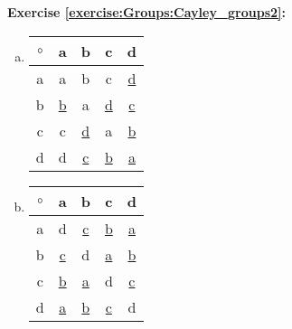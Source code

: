 \noindent\textbf{Exercise \ref{exercise:Groups:Cayley_groups2}:}
\begin{multicols}{2}
\begin{enumerate}[(a)]

\item
\begin{center}
		\begin{tabular}{c| c c c c }
			$\circ$ & a & b & c & d\\
			\hline
			a & a & b & c & \underline{d}\\
			b & \underline{b} & a & \underline{d} & \underline{c}\\
			c & c & \underline{d} & a & \underline{b}\\
			d & d & \underline{c} & \underline{b} & \underline{a}
		\end{tabular}
	\end{center}


\item
\begin{center}
		\begin{tabular}{c| c c c c }
			$\circ$ & a & b & c & d\\
			\hline
			a & d & \underline{c} & \underline{b} & \underline{a}\\
			b &\underline{c} & d & \underline{a} & \underline{b}\\
			c & \underline{b} & \underline{a} & d & \underline{c}\\
			d & \underline{a} & \underline{b} & \underline{c} & d
		\end{tabular}
	\end{center}
	

\end{enumerate}
\end{multicols}
